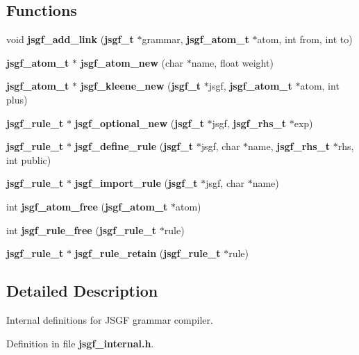\subsection*{Functions}
\begin{DoxyCompactItemize}
\item 
void {\bfseries jsgf\-\_\-add\-\_\-link} ({\bf jsgf\-\_\-t} $\ast$grammar, {\bf jsgf\-\_\-atom\-\_\-t} $\ast$atom, int from, int to)\label{jsgf__internal_8h_acb5af4a04abc56a8584eba9b937f8154}

\item 
{\bf jsgf\-\_\-atom\-\_\-t} $\ast$ {\bfseries jsgf\-\_\-atom\-\_\-new} (char $\ast$name, float weight)\label{jsgf__internal_8h_a0e59b63784fa8761358bb2bdf568bec1}

\item 
{\bf jsgf\-\_\-atom\-\_\-t} $\ast$ {\bfseries jsgf\-\_\-kleene\-\_\-new} ({\bf jsgf\-\_\-t} $\ast$jsgf, {\bf jsgf\-\_\-atom\-\_\-t} $\ast$atom, int plus)\label{jsgf__internal_8h_ab9dc2ab39224cda76c43822150cf7e67}

\item 
{\bf jsgf\-\_\-rule\-\_\-t} $\ast$ {\bfseries jsgf\-\_\-optional\-\_\-new} ({\bf jsgf\-\_\-t} $\ast$jsgf, {\bf jsgf\-\_\-rhs\-\_\-t} $\ast$exp)\label{jsgf__internal_8h_a4a07cb0721add8783f0ea24dfacd6c0f}

\item 
{\bf jsgf\-\_\-rule\-\_\-t} $\ast$ {\bfseries jsgf\-\_\-define\-\_\-rule} ({\bf jsgf\-\_\-t} $\ast$jsgf, char $\ast$name, {\bf jsgf\-\_\-rhs\-\_\-t} $\ast$rhs, int public)\label{jsgf__internal_8h_a91539f6bf30f85af4b90b5a85598f53f}

\item 
{\bf jsgf\-\_\-rule\-\_\-t} $\ast$ {\bfseries jsgf\-\_\-import\-\_\-rule} ({\bf jsgf\-\_\-t} $\ast$jsgf, char $\ast$name)\label{jsgf__internal_8h_afe1e47584e4dd80929552ffed77373f2}

\item 
int {\bfseries jsgf\-\_\-atom\-\_\-free} ({\bf jsgf\-\_\-atom\-\_\-t} $\ast$atom)\label{jsgf__internal_8h_a289d683bf62d1a5aaac6917fa64f54f2}

\item 
int {\bfseries jsgf\-\_\-rule\-\_\-free} ({\bf jsgf\-\_\-rule\-\_\-t} $\ast$rule)\label{jsgf__internal_8h_af2faf6fb74ad1e4d43cf990c1bcec672}

\item 
{\bf jsgf\-\_\-rule\-\_\-t} $\ast$ {\bfseries jsgf\-\_\-rule\-\_\-retain} ({\bf jsgf\-\_\-rule\-\_\-t} $\ast$rule)\label{jsgf__internal_8h_ad152a23eb0f0d9af8417919fc93074fd}

\end{DoxyCompactItemize}


\subsection{Detailed Description}
Internal definitions for J\-S\-G\-F grammar compiler. 

Definition in file {\bf jsgf\-\_\-internal.\-h}.

